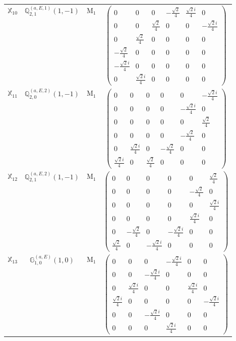\documentclass[fleqn,10pt,landscape]{article}
\begin{document}
\begin{itemize}
\begin{center}
\begin{longtable}{c|c|c|c}
$ \mathbb{X}_{10} $ & $\mathbb{Q}_{2,1}^{(a,E,1)}(1,-1)$ & M$_{1}$ & $\begin{pmatrix} 0 & 0 & 0 & - \frac{\sqrt{2}}{4} & \frac{\sqrt{2} i}{4} & 0 \\ 0 & 0 & \frac{\sqrt{2}}{4} & 0 & 0 & - \frac{\sqrt{2} i}{4} \\ 0 & \frac{\sqrt{2}}{4} & 0 & 0 & 0 & 0 \\ - \frac{\sqrt{2}}{4} & 0 & 0 & 0 & 0 & 0 \\ - \frac{\sqrt{2} i}{4} & 0 & 0 & 0 & 0 & 0 \\ 0 & \frac{\sqrt{2} i}{4} & 0 & 0 & 0 & 0 \end{pmatrix}$ \\
$ \mathbb{X}_{11} $ & $\mathbb{Q}_{2,0}^{(a,E,2)}(1,-1)$ & M$_{1}$ & $\begin{pmatrix} 0 & 0 & 0 & 0 & 0 & - \frac{\sqrt{2} i}{4} \\ 0 & 0 & 0 & 0 & - \frac{\sqrt{2} i}{4} & 0 \\ 0 & 0 & 0 & 0 & 0 & \frac{\sqrt{2}}{4} \\ 0 & 0 & 0 & 0 & - \frac{\sqrt{2}}{4} & 0 \\ 0 & \frac{\sqrt{2} i}{4} & 0 & - \frac{\sqrt{2}}{4} & 0 & 0 \\ \frac{\sqrt{2} i}{4} & 0 & \frac{\sqrt{2}}{4} & 0 & 0 & 0 \end{pmatrix}$ \\
$ \mathbb{X}_{12} $ & $\mathbb{Q}_{2,1}^{(a,E,2)}(1,-1)$ & M$_{1}$ & $\begin{pmatrix} 0 & 0 & 0 & 0 & 0 & \frac{\sqrt{2}}{4} \\ 0 & 0 & 0 & 0 & - \frac{\sqrt{2}}{4} & 0 \\ 0 & 0 & 0 & 0 & 0 & \frac{\sqrt{2} i}{4} \\ 0 & 0 & 0 & 0 & \frac{\sqrt{2} i}{4} & 0 \\ 0 & - \frac{\sqrt{2}}{4} & 0 & - \frac{\sqrt{2} i}{4} & 0 & 0 \\ \frac{\sqrt{2}}{4} & 0 & - \frac{\sqrt{2} i}{4} & 0 & 0 & 0 \end{pmatrix}$ \\
$ \mathbb{X}_{13} $ & $\mathbb{G}_{1,0}^{(a,E)}(1,0)$ & M$_{1}$ & $\begin{pmatrix} 0 & 0 & 0 & - \frac{\sqrt{2} i}{4} & 0 & 0 \\ 0 & 0 & - \frac{\sqrt{2} i}{4} & 0 & 0 & 0 \\ 0 & \frac{\sqrt{2} i}{4} & 0 & 0 & \frac{\sqrt{2} i}{4} & 0 \\ \frac{\sqrt{2} i}{4} & 0 & 0 & 0 & 0 & - \frac{\sqrt{2} i}{4} \\ 0 & 0 & - \frac{\sqrt{2} i}{4} & 0 & 0 & 0 \\ 0 & 0 & 0 & \frac{\sqrt{2} i}{4} & 0 & 0 \end{pmatrix}$ \\

\end{longtable}
\end{center}
\end{itemize}
\end{document}
